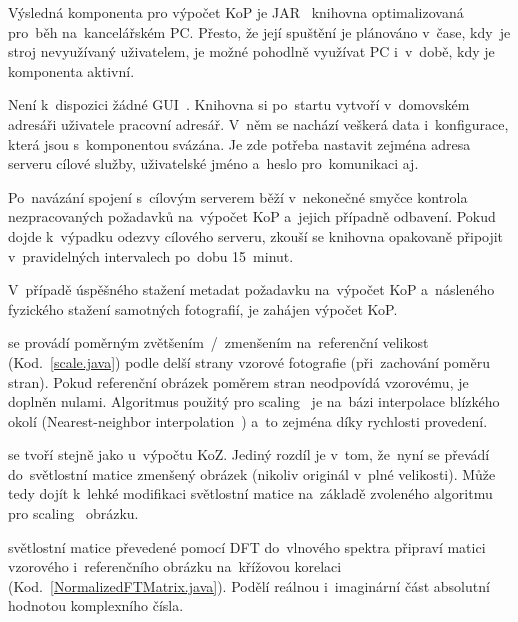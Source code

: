 



Výsledná komponenta pro výpočet KoP je JAR~\cite{jar} knihovna optimalizovaná pro~běh na~kancelářském PC. Přesto, že její spuštění je plánováno v~čase, kdy~je stroj nevyužívaný uživatelem, je možné pohodlně využívat PC i~v~době, kdy je komponenta aktivní.

Není k~dispozici žádné GUI~\cite{gui}. Knihovna si po~startu vytvoří v~domovském adresáři uživatele pracovní adresář. V~něm se nachází veškerá data i~konfigurace, která jsou s~komponentou svázána. Je zde potřeba nastavit zejména adresa serveru cílové služby, uživatelské jméno a~heslo pro~komunikaci aj.

Po~navázání spojení s~cílovým serverem běží v~nekonečné smyčce kontrola nezpracovaných požadavků na~výpočet KoP a~jejich případně odbavení. Pokud dojde k~výpadku odezvy cílového serveru, zkouší se knihovna opakovaně připojit v~pravidelných intervalech po~dobu 15~minut.

V~případě úspěšného stažení metadat požadavku na~výpočet KoP a~násleného fyzického stažení samotných fotografií, je zahájen výpočet KoP.

 se provádí poměrným zvětšením~/~zmenšením na~referenční velikost (Kod.~\ref{scale.java}) podle delší strany vzorové fotografie (při~zachování poměru stran). Pokud referenční obrázek poměrem stran neodpovídá vzorovému, je doplněn nulami. Algoritmus použitý pro scaling~\cite{scaling} je na~bázi interpolace blízkého okolí (Nearest-neighbor interpolation~\cite{nearest-neighbor-interpolation}) a~to zejména díky rychlosti provedení.

 se tvoří stejně jako u~výpočtu KoZ. Jediný rozdíl je v~tom, že~nyní se převádí do~světlostní matice zmenšený obrázek (nikoliv originál v~plné velikosti). Může tedy dojít k~lehké modifikaci světlostní matice na~základě zvoleného algoritmu pro scaling~\cite{scaling} obrázku.

 světlostní matice převedené pomocí DFT do~vlnového spektra připraví matici vzorového i~referenčního obrázku na~křížovou korelaci (Kod.~\ref{NormalizedFTMatrix.java}). Podělí reálnou i~imaginární část absolutní hodnotou komplexního čísla.


